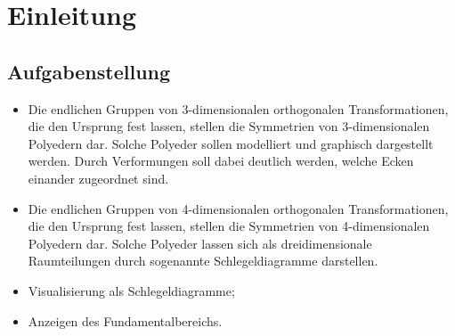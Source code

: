 \section{Einleitung}

\subsection{Aufgabenstellung}
    \begin{itemize}
        \item Die endlichen Gruppen von 3-dimensionalen orthogonalen Transformationen, die den Ursprung fest lassen, stellen die Symmetrien von 3-dimensionalen Polyedern dar. Solche Polyeder sollen modelliert und graphisch dargestellt werden. Durch Verformungen soll dabei deutlich werden, welche Ecken einander zugeordnet sind.
        \item Die endlichen Gruppen von 4-dimensionalen orthogonalen Transformationen, die den Ursprung fest lassen, stellen die Symmetrien von 4-dimensionalen Polyedern dar. Solche Polyeder lassen sich als dreidimensionale Raumteilungen durch sogenannte Schlegeldiagramme darstellen.
        \item Visualisierung als Schlegeldiagramme;
        \item Anzeigen des Fundamentalbereichs.
    \end{itemize}